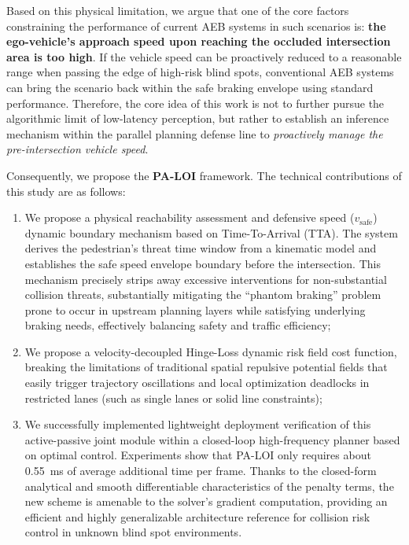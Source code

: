 \documentclass[conference]{IEEEtran}
\begin{document}
Based on this physical limitation, we argue that one of the core factors constraining the performance of current AEB systems in such scenarios is: \textbf{the ego-vehicle's approach speed upon reaching the occluded intersection area is too high}. If the vehicle speed can be proactively reduced to a reasonable range when passing the edge of high-risk blind spots, conventional AEB systems can bring the scenario back within the safe braking envelope using standard performance. Therefore, the core idea of this work is not to further pursue the algorithmic limit of low-latency perception, but rather to establish an inference mechanism within the parallel planning defense line to \emph{proactively manage the pre-intersection vehicle speed}.

Consequently, we propose the \textbf{PA-LOI} framework. The technical contributions of this study are as follows:
\begin{enumerate}
    \item We propose a physical reachability assessment and defensive speed ($v_{\text{safe}}$) dynamic boundary mechanism based on Time-To-Arrival (TTA). The system derives the pedestrian's threat time window from a kinematic model and establishes the safe speed envelope boundary before the intersection. This mechanism precisely strips away excessive interventions for non-substantial collision threats, substantially mitigating the ``phantom braking'' problem prone to occur in upstream planning layers while satisfying underlying braking needs, effectively balancing safety and traffic efficiency;
    \item We propose a velocity-decoupled Hinge-Loss dynamic risk field cost function, breaking the limitations of traditional spatial repulsive potential fields that easily trigger trajectory oscillations and local optimization deadlocks in restricted lanes (such as single lanes or solid line constraints);
    \item We successfully implemented lightweight deployment verification of this active-passive joint module within a closed-loop high-frequency planner based on optimal control. Experiments show that PA-LOI only requires about \SI{0.55}{\milli\second} of average additional time per frame. Thanks to the closed-form analytical and smooth differentiable characteristics of the penalty terms, the new scheme is amenable to the solver's gradient computation, providing an efficient and highly generalizable architecture reference for collision risk control in unknown blind spot environments.
\end{enumerate}
\end{document}
